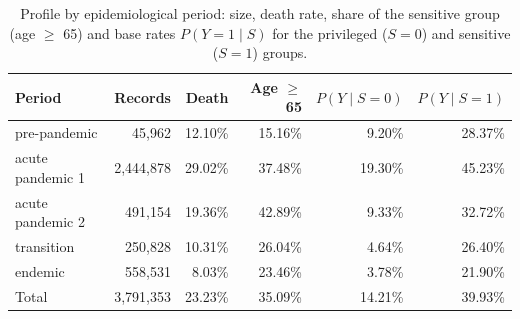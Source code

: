 \begin{table}
  \small
  \caption{Profile by epidemiological period: size, death rate, share of the sensitive group (age $\geq$ 65) and base rates $P(Y=1\mid S)$ for the privileged ($S=0$) and sensitive ($S=1$) groups.}
  \label{tab:period-profile}
  \begin{tabular}{lrrrrr}
    \toprule
    Period & Records & Death & Age $\geq$ 65 & $P(Y\mid S=0)$ & $P(Y\mid S=1)$ \\
    \midrule
    pre-pandemic & 45,962 & 12.10\% & 15.16\% & 9.20\% & 28.37\% \\
    acute pandemic 1 & 2,444,878 & 29.02\% & 37.48\% & 19.30\% & 45.23\% \\
    acute pandemic 2 & 491,154 & 19.36\% & 42.89\% & 9.33\% & 32.72\% \\
    transition & 250,828 & 10.31\% & 26.04\% & 4.64\% & 26.40\% \\
    endemic & 558,531 & 8.03\% & 23.46\% & 3.78\% & 21.90\% \\
    \midrule
    Total & 3,791,353 & 23.23\% & 35.09\% & 14.21\% & 39.93\% \\
    \bottomrule
  \end{tabular}
\end{table}
